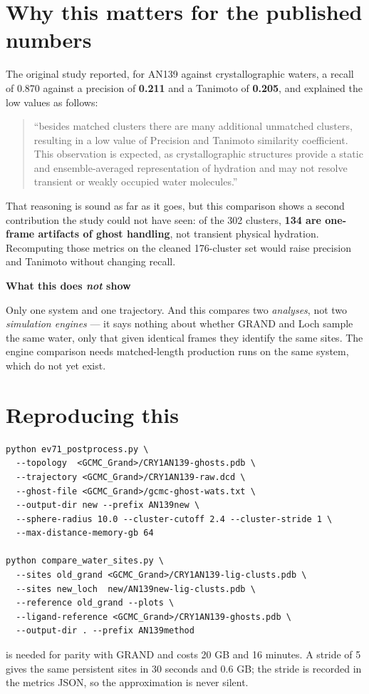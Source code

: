 \documentclass[11pt]{article}
\newcommand{\code}[1]{\texttt{\detokenize{#1}}}
\newenvironment{caveat}[1]{%
  \begin{lrbox}{\gpbox}\begin{minipage}{0.94\linewidth}%
  \textbf{\textcolor{red!55!black}{#1}}\par\smallskip\small}%
 {\end{minipage}\end{lrbox}%
  \begin{center}\setlength{\fboxrule}{0.7pt}%
  \fcolorbox{red!55!black}{red!4}{\usebox{\gpbox}}\end{center}}
\begin{document}
\section{Why this matters for the published numbers}

The original study reported, for AN139 against crystallographic waters, a recall of 0.870
against a precision of \textbf{0.211} and a Tanimoto of \textbf{0.205}, and explained the low
values as follows:

\begin{quote}\small
``besides matched clusters there are many additional unmatched clusters, resulting in a low
value of Precision and Tanimoto similarity coefficient. This observation is expected, as
crystallographic structures provide a static and ensemble-averaged representation of
hydration and may not resolve transient or weakly occupied water molecules.''
\end{quote}

That reasoning is sound as far as it goes, but this comparison shows a second contribution
the study could not have seen: of the 302 clusters, \textbf{134 are one-frame artifacts of
ghost handling}, not transient physical hydration. Recomputing those metrics on the cleaned
176-cluster set would raise precision and Tanimoto without changing recall.

\begin{caveat}{What this does \emph{not} show}
Only one system and one trajectory. And this compares two \emph{analyses}, not two
\emph{simulation engines} --- it says nothing about whether GRAND and Loch sample the same
water, only that given identical frames they identify the same sites. The engine comparison
needs matched-length production runs on the same system, which do not yet exist.
\end{caveat}

\section{Reproducing this}

\begin{lstlisting}[basicstyle=\ttfamily\footnotesize]
python ev71_postprocess.py \
  --topology  <GCMC_Grand>/CRY1AN139-ghosts.pdb \
  --trajectory <GCMC_Grand>/CRY1AN139-raw.dcd \
  --ghost-file <GCMC_Grand>/gcmc-ghost-wats.txt \
  --output-dir new --prefix AN139new \
  --sphere-radius 10.0 --cluster-cutoff 2.4 --cluster-stride 1 \
  --max-distance-memory-gb 64

python compare_water_sites.py \
  --sites old_grand <GCMC_Grand>/CRY1AN139-lig-clusts.pdb \
  --sites new_loch  new/AN139new-lig-clusts.pdb \
  --reference old_grand --plots \
  --ligand-reference <GCMC_Grand>/CRY1AN139-ghosts.pdb \
  --output-dir . --prefix AN139method
\end{lstlisting}

\noindent\small
\code{--cluster-stride 1} is needed for parity with GRAND and costs 20 GB and 16 minutes. A
stride of 5 gives the same persistent sites in 30 seconds and 0.6 GB; the stride is recorded
in the metrics JSON, so the approximation is never silent.
\end{document}
